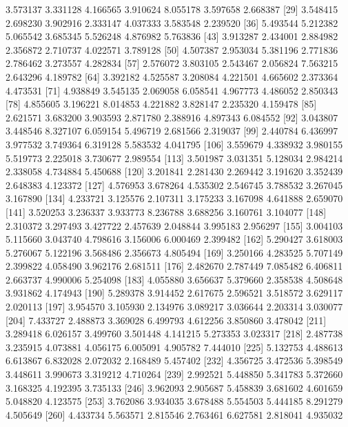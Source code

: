 \documentclass[12pt]{article}
\begin{document}
\begin{Schunk}
\begin{Soutput}
 [22]  3.573137  3.331128  4.166565  3.910624  8.055178  3.597658  2.668387
 [29]  3.548415  2.698230  3.902916  2.333147  4.037333  3.583548  2.239520
 [36]  5.493544  5.212382  5.065542  3.685345  5.526248  4.876982  5.763836
 [43]  3.913287  2.434001  2.884982  2.356872  2.710737  4.022571  3.789128
 [50]  4.507387  2.953034  5.381196  2.771836  2.786462  3.273557  4.282834
 [57]  2.576072  3.803105  2.543467  2.056824  7.563215  2.643296  4.189782
 [64]  3.392182  4.525587  3.208084  4.221501  4.665602  2.373364  4.473531
 [71]  4.938849  3.545135  2.069058  6.058541  4.967773  4.486052  2.850343
 [78]  4.855605  3.196221  8.014853  4.221882  3.828147  2.235320  4.159478
 [85]  2.621571  3.683200  3.903593  2.871780  2.388916  4.897343  6.084552
 [92]  3.043807  3.448546  8.327107  6.059154  5.496719  2.681566  2.319037
 [99]  2.440784  6.436997  3.977532  3.749364  6.319128  5.583532  4.041795
[106]  3.559679  4.338932  3.980155  5.519773  2.225018  3.730677  2.989554
[113]  3.501987  3.031351  5.128034  2.984214  2.338058  4.734884  5.450688
[120]  3.201841  2.281430  2.269442  3.191620  3.352439  2.648383  4.123372
[127]  4.576953  3.678264  4.535302  2.546745  3.788532  3.267045  3.167890
[134]  4.233721  3.125576  2.107311  3.175233  3.167098  4.641888  2.659070
[141]  3.520253  3.236337  3.933773  8.236788  3.688256  3.160761  3.104077
[148]  2.310372  3.297493  3.427722  2.457639  2.048844  3.995183  2.956297
[155]  3.004103  5.115660  3.043740  4.798616  3.156006  6.000469  2.399482
[162]  5.290427  3.618003  5.276067  5.122196  3.568486  2.356673  4.805494
[169]  3.250166  4.283525  5.707149  2.399822  4.058490  3.962176  2.681511
[176]  2.482670  2.787449  7.085482  6.406811  2.663737  4.990006  5.254098
[183]  4.055880  3.656637  5.379660  2.358538  4.508648  3.931862  4.174943
[190]  5.289378  3.914452  2.617675  2.596521  3.518572  3.629117  2.020113
[197]  3.954570  3.105930  2.134976  3.089217  3.036644  2.203314  3.030077
[204]  7.433727  2.488873  3.369028  6.499793  4.612256  3.850860  3.478042
[211]  3.289418  6.026157  3.499760  3.501448  4.141215  5.273353  3.023317
[218]  2.487738  3.235915  4.073881  4.056175  6.005091  4.905782  7.444010
[225]  5.132753  4.488613  6.613867  6.832028  2.072032  2.168489  5.457402
[232]  4.356725  3.472536  5.398549  3.448611  3.990673  3.319212  4.710264
[239]  2.992521  5.448850  5.341783  5.372660  3.168325  4.192395  3.735133
[246]  3.962093  2.905687  5.458839  3.681602  4.601659  5.048820  4.123575
[253]  3.762086  3.934035  3.678488  5.554503  5.444185  8.291279  4.505649
[260]  4.433734  5.563571  2.815546  2.763461  6.627581  2.818041  4.935032

\end{Soutput}
\end{Schunk}
\end{document}
